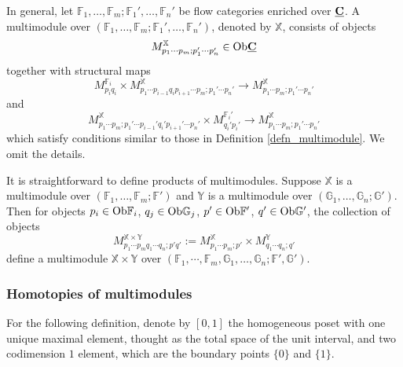 \documentclass[reqno, 10pt]{amsart}
\numberwithin{equation}{section}
\numberwithin{equation}{section}
\theoremstyle{definition}
\theoremstyle{remark}
\newcommand{\beqn}{\begin{equation*}}
\newcommand{\eeqn}{\end{equation*}}
\newcommand{\mb}{\mathbb}
\newcommand{\uds}[1]{\underline{\smash{#1}}}
\begin{document}
In general, let ${\mb F}_1, \ldots, {\mb F}_m; {\mb F}_1', \ldots, {\mb F}_n'$ be flow categories enriched over $\uds{\bf C}$. A multimodule over $({\mb F}_1, \ldots, {\mb F}_m; {\mb F}_1', \ldots, {\mb F}_n')$, denoted by ${\mb X}$, consists of objects
\beqn
M_{p_1 \cdots p_m; p_1' \cdots p_n'}^{\mb X} \in {\rm Ob} \uds{\bf C}
\eeqn
together with structural maps
\beqn
M_{p_i q_i}^{{\mb F}_i} \times M_{p_1 \cdots p_{i-1} q_i p_{i+1} \cdots p_m; p_1' \cdots p_n'}^{\mb X} \to M_{p_1 \cdots p_m; p_1' \cdots p_n'}^{\mb X}
\eeqn
and
\beqn
M_{p_1 \cdots p_m; p_1' \cdots p_{i-1}' q_i' p_{i+1}' \cdots p_n'}^{\mb X} \times M_{q_i' p_i'}^{{\mb F}_i'} \to M_{p_1 \cdots p_m; p_1' \cdots p_n'}^{\mb X}
\eeqn
which satisfy conditions similar to those in Definition \ref{defn_multimodule}. We omit the details. 



It is straightforward to define products of multimodules. Suppose ${\mb X}$ is a multimodule over $({\mb F}_1, \ldots, {\mb F}_m; {\mb F}')$ and ${\mb Y}$ is a multimodule over $({\mb G}_1, \ldots, {\mb G}_n; {\mb G}')$. Then for objects $p_i \in {\rm Ob}{\mb F}_i$, $q_j \in {\rm Ob}{\mb G}_j$, $p' \in {\rm Ob}{\mb F}'$, $q' \in {\rm Ob}{\mb G}'$, the collection of objects
\beqn
M_{p_1 \cdots p_m q_1 \cdots q_n; p'q'}^{{\mb X} \times {\mb Y}}:=  M_{p_1 \cdots p_m; p'}^{\mb X} \times M_{q_1 \cdots q_n; q'}^{\mb Y}
\eeqn
define a multimodule ${\mb X} \times {\mb Y}$ over $({\mb F}_1, \cdots, {\mb F}_m, {\mb G}_1, \ldots, {\mb G}_n; {\mb F}', {\mb G}')$.






\subsubsection{Homotopies of multimodules}
For the following definition, denote by $[0,1]$ the homogeneous poset with one unique maximal element, thought as the total space of the unit interval, and two codimension $1$ element, which are the boundary points $\{0\}$ and $\{1\}$.
\end{document}
